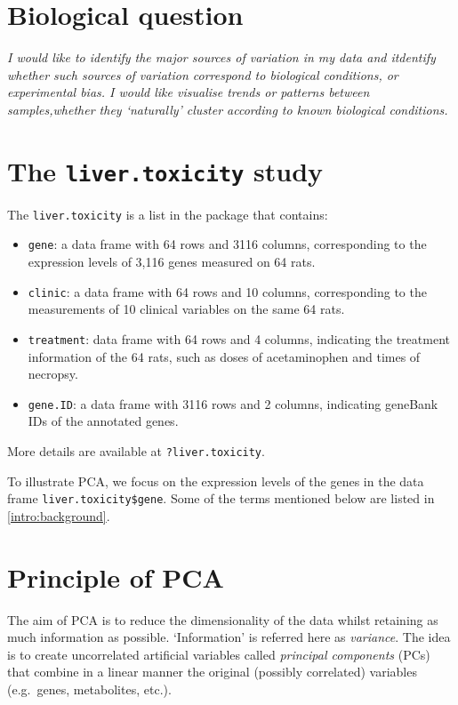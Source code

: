 \documentclass[]{book}
\theoremstyle{definition}
\theoremstyle{definition}
\theoremstyle{definition}
\theoremstyle{remark}
\begin{document}
\section{Biological question}\label{biological-question}

{ \emph{I would like to identify the major sources of variation in my
data and itdentify whether such sources of variation correspond to
biological conditions, or experimental bias. I would like visualise
trends or patterns between samples,whether they `naturally' cluster
according to known biological conditions.} }

\section{\texorpdfstring{The \texttt{liver.toxicity}
study}{The liver.toxicity study}}\label{the-liver.toxicity-study}

The \texttt{liver.toxicity} is a list in the package that contains:

\begin{itemize}
\item
  \texttt{gene}: a data frame with 64 rows and 3116 columns,
  corresponding to the expression levels of 3,116 genes measured on 64
  rats.
\item
  \texttt{clinic}: a data frame with 64 rows and 10 columns,
  corresponding to the measurements of 10 clinical variables on the same
  64 rats.
\item
  \texttt{treatment}: data frame with 64 rows and 4 columns, indicating
  the treatment information of the 64 rats, such as doses of
  acetaminophen and times of necropsy.
\item
  \texttt{gene.ID}: a data frame with 3116 rows and 2 columns,
  indicating geneBank IDs of the annotated genes.
\end{itemize}

More details are available at \texttt{?liver.toxicity}.

To illustrate PCA, we focus on the expression levels of the genes in the
data frame \texttt{liver.toxicity\$gene}. Some of the terms mentioned
below are listed in \ref{intro:background}.

\section{Principle of PCA}\label{principle-of-pca}

The aim of PCA \citep{Jol05} is to reduce the dimensionality of the data
whilst retaining as much information as possible. `Information' is
referred here as \emph{variance}. The idea is to create uncorrelated
artificial variables called \emph{principal components} (PCs) that
combine in a linear manner the original (possibly correlated) variables
(e.g.~genes, metabolites, etc.).
\end{document}

